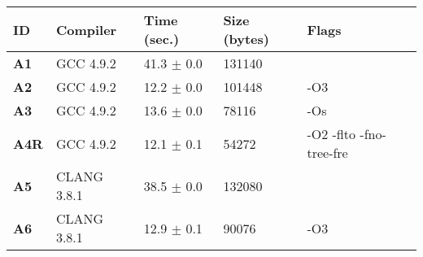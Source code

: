    \begin{tabular}{|l|l|l|l|p{3.2in}|}
     \hline
      \textbf{ID} & \textbf{Compiler} & \textbf{Time (sec.)} & \textbf{Size (bytes)} & \textbf{Flags} \\ 
     \hline
      \textbf{ A1 } &  GCC 4.9.2  &  41.3 $\pm$ 0.0  &  131140  & {\small  }\\
     \hline
      \textbf{ A2 } &  GCC 4.9.2  &  12.2 $\pm$ 0.0  &  101448  & {\small -O3 }\\
     \hline
      \textbf{ A3 } &  GCC 4.9.2  &  13.6 $\pm$ 0.0  &  78116  & {\small -Os }\\
     \hline
      \textbf{ A4R } &  GCC 4.9.2  &  12.1 $\pm$ 0.1  &  54272  & {\small -O2 -flto -fno-tree-fre }\\
     \hline
      \textbf{ A5 } &  CLANG 3.8.1  &  38.5 $\pm$ 0.0  &  132080  & {\small  }\\
     \hline
      \textbf{ A6 } &  CLANG 3.8.1  &  12.9 $\pm$ 0.1  &  90076  & {\small -O3 }\\
     \hline
    \end{tabular}    